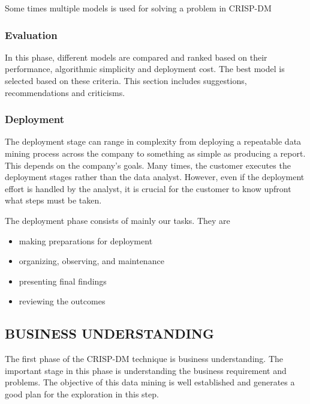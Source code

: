 \documentclass[
]{article}
\begin{document}
Some times multiple models is used for solving a problem in CRISP-DM

\hypertarget{evaluation}{%
\subsubsection{\texorpdfstring{\textbf{Evaluation}}{Evaluation}}\label{evaluation}}

In this phase, different models are compared and ranked based on their
performance, algorithmic simplicity and deployment cost. The best model
is selected based on these criteria. This section includes suggestions,
recommendations and criticisms.

\hypertarget{deployment}{%
\subsubsection{\texorpdfstring{\textbf{Deployment}}{Deployment}}\label{deployment}}

The deployment stage can range in complexity from deploying a repeatable
data mining process across the company to something as simple as
producing a report. This depends on the company's goals. Many times, the
customer executes the deployment stages rather than the data analyst.
However, even if the deployment effort is handled by the analyst, it is
crucial for the customer to know upfront what steps must be taken.

The deployment phase consists of mainly our tasks. They are

\begin{itemize}
\item
  making preparations for deployment
\item
  organizing, observing, and maintenance~
\item
  presenting final findings
\item
  reviewing the outcomes
\end{itemize}

\hypertarget{business-understanding-1}{%
\subsection{BUSINESS UNDERSTANDING}\label{business-understanding-1}}

The first phase of the CRISP-DM technique is business understanding. The
important stage in this phase is understanding the business requirement
and problems. The objective of this data mining is well established and
generates a good plan for the exploration in this step.
\end{document}
